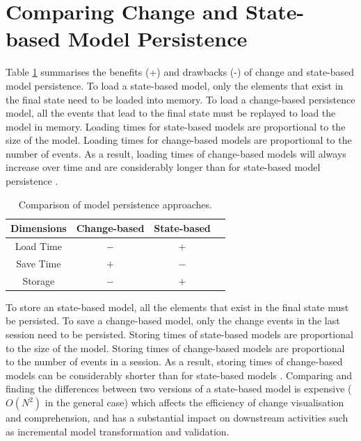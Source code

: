 \section{Comparing Change and State-based Model Persistence}
\label{sec:change_and_state_based_model_persistence}
Table \ref{table:persistence_comparsion} summarises the benefits (+) and drawbacks (-) of change and state-based model persistence. To load a state-based model, only the elements that exist in the final state need to be loaded into memory. To load a change-based persistence model, all the events that lead to the final state must be replayed to load the model in memory. Loading times for state-based models are proportional to the size of the model. Loading times for change-based models are proportional to the number of events. As a result, loading times of change-based models will always increase over time and are considerably longer than for state-based model persistence \cite{yohannis2018towards,mens2002state}. 

\begin{table}[ht]
  \caption{Comparison of model persistence approaches.}
  \label{table:persistence_comparsion}
  \centering
  \begin{small}
    \begin{tabular}{ c c c c }
      \hline 
      \textbf{Dimensions} & \textbf{Change-based} & \textbf{State-based} \\
      \hline 
      Load Time & $-$ & $+$ \\
      Save Time & $+$ & $-$ \\
      Storage & $-$ & $+$ \\
      \hline 
    \end{tabular}
  \end{small}
\end{table}

To store an state-based model, all the elements that exist in the final state must be persisted. To save a change-based model, only the change events in the last session need to be persisted. Storing times of state-based models are proportional to the size of the model. Storing times of change-based models are proportional to the number of events in a session. As a result, storing times of change-based models can be considerably shorter than for state-based models \cite{yohannis2018towards}. Comparing and finding the differences between two versions of a state-based model is expensive \cite{Kolovos:2009:DMM:1564596.1564641} ($O(N^2)$ in the general case) which affects the efficiency of change visualisation and comprehension, and has a substantial impact on downstream activities such as incremental model transformation \cite{DBLP:conf/ecmdafa/OgunyomiRK15} and validation.

